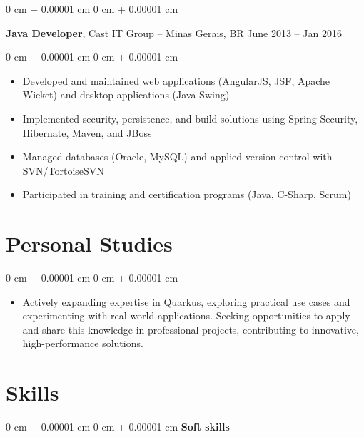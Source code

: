 \documentclass[10pt, letterpaper]{article}
\newenvironment{highlights}{
    \begin{itemize}[
        topsep=0.10 cm,
        parsep=0.10 cm,
        partopsep=0pt,
        itemsep=0pt,
        leftmargin=0 cm + 10pt
    ]
}{
    \end{itemize}
} %
\newenvironment{onecolentry}{
    \begin{adjustwidth}{
        0 cm + 0.00001 cm
    }{
        0 cm + 0.00001 cm
    }
}{
    \end{adjustwidth}
} %
\newenvironment{twocolentry}[2][]{
    \onecolentry
    \def\secondColumn{#2}
    \setcolumnwidth{\fill, 4.5 cm}
    \begin{paracol}{2}
}{
    \switchcolumn \raggedleft \secondColumn
    \end{paracol}
    \endonecolentry
} %
\begin{document}
        \vspace{0.2 cm}
        
        \begin{twocolentry}{
            June 2013 – Jan 2016
        }
            \textbf{Java Developer}, Cast IT Group -- Minas Gerais, BR\end{twocolentry}

        \vspace{0.10 cm}
        \begin{onecolentry}
            \begin{highlights}
                \item Developed and maintained web applications (AngularJS, JSF, Apache Wicket) and desktop applications (Java Swing)
                \item Implemented security, persistence, and build solutions using Spring Security, Hibernate, Maven, and JBoss
                \item Managed databases (Oracle, MySQL) and applied version control with SVN/TortoiseSVN
                \item Participated in training and certification programs (Java, C-Sharp, Scrum)
            \end{highlights}
        \end{onecolentry}
   \section{Personal Studies}

        \vspace{0.10 cm}
        \begin{onecolentry}
            \begin{highlights}
                \item Actively expanding expertise in Quarkus, exploring practical use cases and experimenting with real-world applications. Seeking opportunities to apply and share this knowledge in professional projects, contributing to innovative, high-performance solutions.
            \end{highlights}
        \end{onecolentry}
        
    \section{Skills}

        \begin{onecolentry} \textbf{Soft skills}\end{onecolentry}
\end{document}
